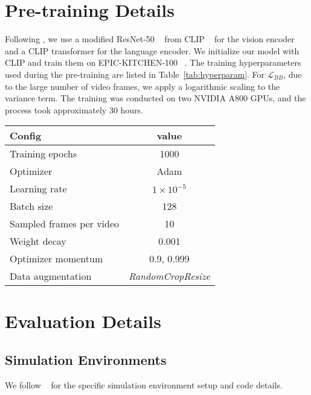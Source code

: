

\section{Pre-training Details}\label{sec:pretrain_details}
Following \cite{icml23-liv,icml24-decisionnce}, we use a modified ResNet-50 ~\cite{cvpr16-resnet} from CLIP ~\cite{icml21-clip} for the vision encoder and a CLIP transformer for the language encoder. We initialize our model with CLIP and train them on EPIC-KITCHEN-100 ~\cite{corr18-epickitchen,corr20-epickitchen}. The training hyperparameters used during the pre-training are listed in Table~\ref{tab:hyperparam}. For $\mathcal{L}_{BB}$, due to the large number of video frames, we apply a logarithmic scaling to the variance term. The training was conducted on two NVIDIA A800 GPUs, and the process took approximately 30 hours. 

\begin{table*}[h]
    \centering
    \caption{Hyper-parameters for pre-training.}
    \label{tab:hyperparam}
    \begin{tabular}{lc}
        \toprule
        Config & value \\
        \midrule
        Training epochs & 1000 \\
        Optimizer & Adam \\
        Learning rate & $1 \times 10^{-5}$ \\
        Batch size & 128 \\
        Sampled frames per video & 10 \\
        Weight decay & 0.001 \\
        Optimizer momentum & 0.9, 0.999 \\
        Data augmentation & \textit{RandomCropResize} \\
        \bottomrule
    \end{tabular}
    
\end{table*}



\section{Evaluation Details}
\subsection{Simulation Environments} \label{sec:app_env}
We follow ~\cite{corl22-r3m} for the specific simulation environment setup and code details.
